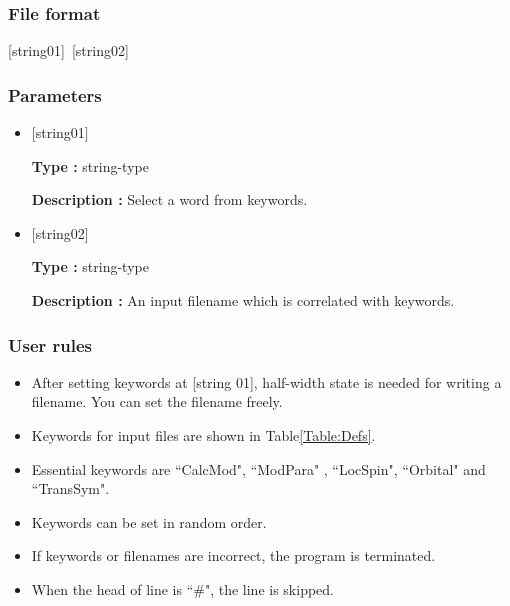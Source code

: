 \subsubsection{File format}
[string01]~[string02]
\subsubsection{Parameters}
 \begin{itemize}
   \item  $[$string01$]$
   
   {\bf Type :} string-type
   
   {\bf Description :} Select a word from keywords.
   
   \item  $[$string02$]$
   
    {\bf Type :} string-type 

   {\bf Description :} An input filename which is correlated with keywords.
 \end{itemize}
\subsubsection{User rules}
\begin{itemize}
\item  After setting keywords at [string 01], half-width state is needed for writing a filename. You can set the filename freely.
\item Keywords for input files are shown in Table\ref{Table:Defs}.
\item Essential keywords are ``CalcMod", ``ModPara" , ``LocSpin", ``Orbital" and ``TransSym".
\item Keywords can be set in random order.
\item If keywords or filenames are incorrect, the program is terminated. 
\item When the head of line is ``$\#$", the line is skipped.
\end{itemize}

